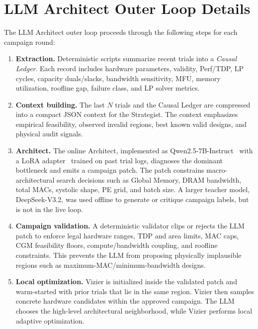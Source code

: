 \newpage


\section{LLM Architect Outer Loop Details}
\label{app:llm_loop}
The LLM Architect outer loop proceeds through the following steps for each campaign round:

\begin{enumerate}

\item \textbf{Extraction.} Deterministic scripts summarize recent trials
into a \emph{Causal Ledger}.
Each record includes hardware parameters, validity, Perf/TDP, LP cycles, capacity duals/slacks, bandwidth sensitivity, MFU, memory utilization, roofline gap, failure class, and LP solver metrics.

\item \textbf{Context building.} The last $N$ trials and the Causal Ledger
are compressed into a compact JSON context for the Strategist.
The context emphasizes empirical feasibility, observed invalid regions, best known valid designs, and physical audit signals.

\item \textbf{Architect.} The online Architect, implemented as
Qwen2.5-7B-Instruct~\citep{qwen25technicalreport} with a LoRA adapter~\citep{hu2021lora} trained on past trial logs, diagnoses the dominant bottleneck and emits a campaign patch.
The patch constrains macro-architectural search decisions such as Global Memory, DRAM bandwidth, total MACs, systolic shape, PE grid, and batch size.
A larger teacher model, DeepSeek-V3.2, was used offline to generate or critique campaign labels, but is not in the live loop.

\item \textbf{Campaign validation.} A deterministic validator clips or rejects the LLM patch to enforce legal hardware ranges, TDP and area limits, MAC caps, CGM feasibility floors, compute/bandwidth coupling, and roofline constraints.
This prevents the LLM from proposing physically implausible regions such as maximum-MAC/minimum-bandwidth designs. 

\item \textbf{Local optimization.} Vizier is initialized inside the
validated patch and warm-started with prior trials that lie in the same region.
Vizier then samples concrete hardware candidates within the approved campaign.
The LLM chooses the high-level architectural neighborhood, while Vizier performs local adaptive optimization.


\end{enumerate}
